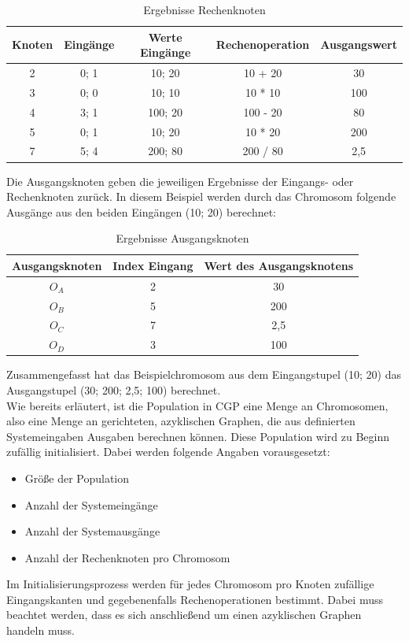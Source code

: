 \begin{table}[H]
    \centering
    \begin{tabular}{c|c|c|c|c}
       \textbf{Knoten} & \textbf{Eingänge} & \textbf{Werte Eingänge} & \textbf{Rechenoperation} & \textbf{Ausgangswert} \\ \hline
        2 & 0; 1 & 10; 20 & 10 + 20 & 30 \\ \hline
        3 & 0; 0 & 10; 10 & 10 * 10 & 100 \\ \hline
        4 & 3; 1 & 100; 20 & 100 - 20 & 80 \\ \hline
        5 & 0; 1 & 10; 20 & 10 * 20 & 200 \\ \hline
        7 & 5; 4 & 200; 80 & 200 / 80 & 2,5
    \end{tabular}
    \caption{Ergebnisse Rechenknoten}
    \label{table:ergebnisseRechenknoten}
\end{table}

Die Ausgangsknoten geben die jeweiligen Ergebnisse der Eingangs- oder Rechenknoten zurück.
In diesem Beispiel werden durch das Chromosom folgende Ausgänge aus den beiden Eingängen (10; 20) berechnet:

\begin{table}[H]
    \centering
    \begin{tabular}{c|c|c}
       \textbf{Ausgangsknoten} & \textbf{Index Eingang} & \textbf{Wert des Ausgangsknotens} \\ \hline
        $O_A$ & 2 & 30 \\ \hline
        $O_B$ & 5 & 200 \\ \hline
        $O_C$ & 7 & 2,5 \\ \hline
        $O_D$ & 3 & 100
    \end{tabular}
    \caption{Ergebnisse Ausgangsknoten}
    \label{table:ergebnisseAusgangsknoten}
\end{table}

Zusammengefasst hat das Beispielchromosom aus dem Eingangstupel (10; 20) das Ausgangstupel (30; 200; 2,5; 100) berechnet.\\

Wie bereits erläutert, ist die Population in CGP eine Menge an Chromosomen, also eine Menge an gerichteten, azyklischen Graphen, die aus definierten Systemeingaben Ausgaben berechnen können.
Diese Population wird zu Beginn zufällig initialisiert.
Dabei werden folgende Angaben vorausgesetzt:
\begin{itemize}
    \item Größe der Population
    \item Anzahl der Systemeingänge
    \item Anzahl der Systemausgänge
    \item Anzahl der Rechenknoten pro Chromosom
\end{itemize}
Im Initialisierungsprozess werden für jedes Chromosom pro Knoten zufällige Eingangskanten und gegebenenfalls Rechenoperationen bestimmt.
Dabei muss beachtet werden, dass es sich anschließend um einen azyklischen Graphen handeln muss.

